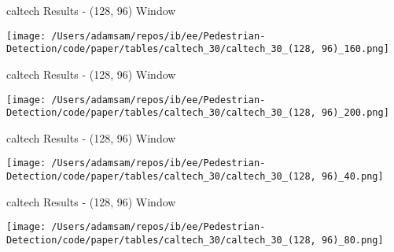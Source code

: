 \begin{table}
    \caption{caltech Results - (128, 96) Window}
    \texttt{[image: /Users/adamsam/repos/ib/ee/Pedestrian-Detection/code/paper/tables/caltech\_30/caltech\_30\_(128, 96)\_160.png]}
    \label{tab:caltech_30_(128, 96)_160}
\end{table}

\begin{table}
    \caption{caltech Results - (128, 96) Window}
    \texttt{[image: /Users/adamsam/repos/ib/ee/Pedestrian-Detection/code/paper/tables/caltech\_30/caltech\_30\_(128, 96)\_200.png]}
    \label{tab:caltech_30_(128, 96)_200}
\end{table}

\begin{table}
    \caption{caltech Results - (128, 96) Window}
    \texttt{[image: /Users/adamsam/repos/ib/ee/Pedestrian-Detection/code/paper/tables/caltech\_30/caltech\_30\_(128, 96)\_40.png]}
    \label{tab:caltech_30_(128, 96)_40}
\end{table}

\begin{table}
    \caption{caltech Results - (128, 96) Window}
    \texttt{[image: /Users/adamsam/repos/ib/ee/Pedestrian-Detection/code/paper/tables/caltech\_30/caltech\_30\_(128, 96)\_80.png]}
    \label{tab:caltech_30_(128, 96)_80}
\end{table}
